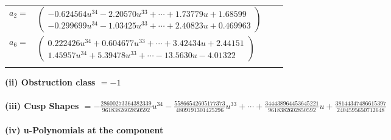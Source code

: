 \documentclass[1p]{elsarticle_modified}
\theoremstyle{definition}
\begin{document}
\begin{tabular}{m{7pt} m{180pt} m{7pt} m{180pt} }
\flushright $a_{2}=$&$\begin{pmatrix}-0.624564 u^{34}-2.20570 u^{33}+\cdots+1.73779 u+1.68599\\-0.299699 u^{34}-1.03425 u^{33}+\cdots+2.40823 u+0.469963\end{pmatrix}$ \\
\flushright $a_{6}=$&$\begin{pmatrix}0.222426 u^{34}+0.604677 u^{33}+\cdots+3.42434 u+2.44151\\1.45957 u^{34}+5.39478 u^{33}+\cdots-13.5630 u-4.01322\end{pmatrix}$\\&\end{tabular}
\flushleft \textbf{(ii) Obstruction class $= -1$}\\~\\
\flushleft \textbf{(iii) Cusp Shapes $= -\frac{28600273364382339}{9618382602850592} u^{34}-\frac{55866542605177373}{4809191301425296} u^{33}+\cdots+\frac{344438964453645221}{9618382602850592} u+\frac{38144347486615397}{2404595650712648}$}\\~\\
\newpage\renewcommand{\arraystretch}{1}
\flushleft \textbf{(iv) u-Polynomials at the component}\newline \\
\end{document}
